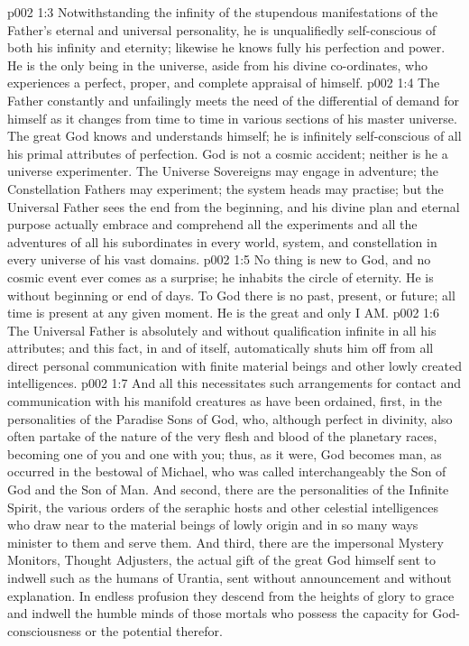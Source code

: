 \vs p002 1:3 \pc Notwithstanding the infinity of the stupendous manifestations of the Father’s eternal and universal personality, he is unqualifiedly self\hyp{}conscious of both his infinity and eternity; likewise he knows fully his perfection and power. He is the only being in the universe, aside from his divine co\hyp{}ordinates, who experiences a perfect, proper, and complete appraisal of himself.
\vs p002 1:4 The Father constantly and unfailingly meets the need of the differential of demand for himself as it changes from time to time in various sections of his master universe. The great God knows and understands himself; he is infinitely self\hyp{}conscious of all his primal attributes of perfection. God is not a cosmic accident; neither is he a universe experimenter. The Universe Sovereigns may engage in adventure; the Constellation Fathers may experiment; the system heads may practise; but the Universal Father sees the end from the beginning, and his divine plan and eternal purpose actually embrace and comprehend all the experiments and all the adventures of all his subordinates in every world, system, and constellation in every universe of his vast domains.
\vs p002 1:5 No thing is new to God, and no cosmic event ever comes as a surprise; he inhabits the circle of eternity. He is without beginning or end of days. To God there is no past, present, or future; all time is present at any given moment. He is the great and only I AM.
\vs p002 1:6 \pc The Universal Father is absolutely and without qualification infinite in all his attributes; and this fact, in and of itself, automatically shuts him off from all direct personal communication with finite material beings and other lowly created intelligences.
\vs p002 1:7 And all this necessitates such arrangements for contact and communication with his manifold creatures as have been ordained, first, in the personalities of the Paradise Sons of God, who, although perfect in divinity, also often partake of the nature of the very flesh and blood of the planetary races, becoming one of you and one with you; thus, as it were, God becomes man, as occurred in the bestowal of Michael, who was called interchangeably the Son of God and the Son of Man. And second, there are the personalities of the Infinite Spirit, the various orders of the seraphic hosts and other celestial intelligences who draw near to the material beings of lowly origin and in so many ways minister to them and serve them. And third, there are the impersonal Mystery Monitors, Thought Adjusters, the actual gift of the great God himself sent to indwell such as the humans of Urantia, sent without announcement and without explanation. In endless profusion they descend from the heights of glory to grace and indwell the humble minds of those mortals who possess the capacity for God\hyp{}consciousness or the potential therefor.
